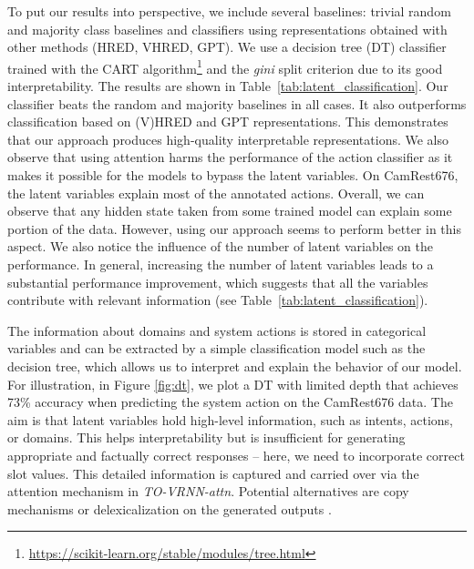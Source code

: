 To put our results into perspective, we include several baselines: trivial random and majority class baselines and classifiers using representations obtained with other methods (HRED, VHRED, GPT).
We use a decision tree (DT) classifier trained with the CART algorithm\footnote{\url{https://scikit-learn.org/stable/modules/tree.html}} and the \emph{gini} split criterion due to its good interpretability.
The results are shown in Table~\ref{tab:latent_classification}.
Our classifier beats the random and majority baselines in all cases.
It also outperforms classification based on (V)HRED and GPT representations.
This demonstrates that our approach produces high-quality interpretable representations.
We also observe that using attention harms the performance of the action classifier as it makes it possible for the models to bypass the latent variables.
On CamRest676, the latent variables explain most of the annotated actions.
Overall, we can observe that any hidden state taken from some trained model can explain some portion of the data.
However, using our approach seems to perform better in this aspect.
We also notice the influence of the number of latent variables on the performance.
In general, increasing the number of latent variables leads to a substantial performance improvement, which suggests that all the variables contribute with relevant information (see Table~\ref{tab:latent_classification}).

The information about domains and system actions is stored in categorical variables and can be extracted by a simple classification model such as the decision tree, which allows us to interpret and explain the behavior of our model.
For illustration, in Figure \ref{fig:dt}, we plot a DT with limited depth that achieves 73\% accuracy when predicting the system action on the CamRest676 data.
The aim is that latent variables hold high-level information, such as intents, actions, or domains. This helps interpretability but is insufficient for generating appropriate and factually correct responses -- here, we need to incorporate correct slot values.
This detailed information is captured and carried over via the attention mechanism in \emph{TO-VRNN-attn}.
Potential alternatives are copy mechanisms \cite{lei2018} or delexicalization on the generated outputs \cite{henderson_robust_2014,peng2021soloist}.

